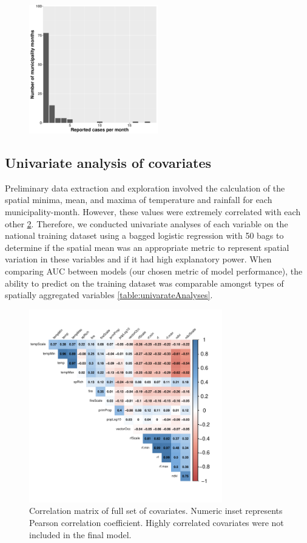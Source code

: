 \documentclass{article}
\begin{document}
\begin{figure} [h]
\centering
\includegraphics[width=0.5\textwidth]{Hist_Reported_Cases}
\caption{}
\label{}
\end{figure}

\subsection*{Univariate analysis of covariates}

Preliminary data extraction and exploration involved the calculation of the spatial minima, mean, and maxima of temperature and rainfall for each municipality-month.
However, these values were extremely correlated with each other \ref{fig:corrmat}.
Therefore, we conducted univariate analyses of each variable on the national training dataset using a bagged logistic regression with 50 bags to determine if the spatial mean was an appropriate metric to represent spatial variation in these variables and if it had high explanatory power.
When comparing AUC between models (our chosen metric of model performance), the ability to predict on the training dataset was comparable amongst types of spatially aggregated variables \ref{table:univarateAnalyses}.

\begin{figure}
\centering
\includegraphics[width=0.75\textwidth]{correlationMatrix}
\caption{Correlation matrix of full set of covariates. Numeric inset represents Pearson correlation coefficient. Highly correlated covariates were not included in the final model.}
\label{fig:corrmat}
\end{figure}
\end{document}
